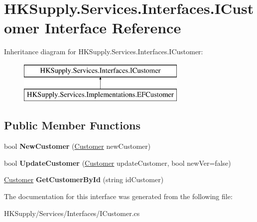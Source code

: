 \hypertarget{interface_h_k_supply_1_1_services_1_1_interfaces_1_1_i_customer}{}\section{H\+K\+Supply.\+Services.\+Interfaces.\+I\+Customer Interface Reference}
\label{interface_h_k_supply_1_1_services_1_1_interfaces_1_1_i_customer}
Inheritance diagram for H\+K\+Supply.\+Services.\+Interfaces.\+I\+Customer\+:\begin{figure}[H]
\begin{center}
\leavevmode
\includegraphics[height=2.000000cm]{interface_h_k_supply_1_1_services_1_1_interfaces_1_1_i_customer}
\end{center}
\end{figure}
\subsection*{Public Member Functions}
\begin{DoxyCompactItemize}
\item 
\mbox{\label{interface_h_k_supply_1_1_services_1_1_interfaces_1_1_i_customer_a4eae770f8e05c2a16b30d11ca2b6a3e8}} 
bool {\bfseries New\+Customer} (\hyperlink{class_h_k_supply_1_1_models_1_1_customer}{Customer} new\+Customer)
\item 
\mbox{\label{interface_h_k_supply_1_1_services_1_1_interfaces_1_1_i_customer_a2f446e665b10feef3e8373887a138048}} 
bool {\bfseries Update\+Customer} (\hyperlink{class_h_k_supply_1_1_models_1_1_customer}{Customer} update\+Customer, bool new\+Ver=false)
\item 
\mbox{\label{interface_h_k_supply_1_1_services_1_1_interfaces_1_1_i_customer_a0ce0dce4e042cf94014fbc1487bf7789}} 
\hyperlink{class_h_k_supply_1_1_models_1_1_customer}{Customer} {\bfseries Get\+Customer\+By\+Id} (string id\+Customer)
\end{DoxyCompactItemize}


The documentation for this interface was generated from the following file\+:\begin{DoxyCompactItemize}
\item 
H\+K\+Supply/\+Services/\+Interfaces/I\+Customer.\+cs\end{DoxyCompactItemize}
